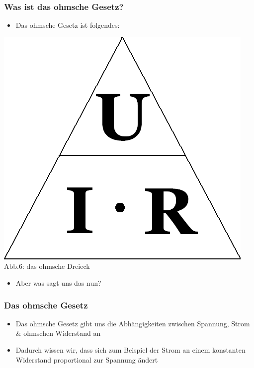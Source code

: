 \begin{frame}
    \frametitle{Was ist das ohmsche Gesetz?}
    \begin{itemize}
    	\item Das ohmsche Gesetz ist folgendes:
    \end{itemize}
    \begin{center}
 		\includegraphics[width=.5\textwidth,height=.6\textheight,keepaspectratio]{e03/Ohm_law_triangle.png}\\
 		\small{Abb.6: das ohmsche Dreieck \cite{wmen}}
 	\end{center}
 	\begin{itemize}
 		\item	Aber was sagt uns das nun?
 	\end{itemize}
\end{frame}

\begin{frame}
	\frametitle{Das ohmsche Gesetz}
	\begin{itemize}
		\item	Das ohmsche Gesetz gibt uns die Abhängigkeiten zwischen Spannung, Strom \& ohmschen Widerstand an
		\item	Dadurch wissen wir, dass sich zum Beispiel der Strom an einem konstanten Widerstand proportional zur Spannung ändert
	\end{itemize}
\end{frame}

